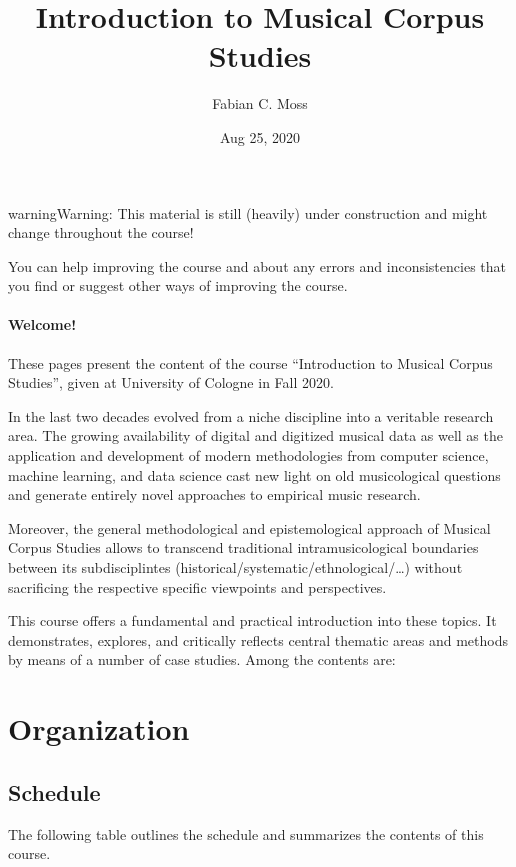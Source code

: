\documentclass[letterpaper,10pt,english]{sphinxmanual}
\title{Introduction to Musical Corpus Studies}
\date{Aug 25, 2020}
\author{Fabian C.\@{} Moss}
\begin{document}
\pagestyle{empty}
\sphinxmaketitle
\pagestyle{plain}
\sphinxtableofcontents
\pagestyle{normal}
\label{\detokenize{index::doc}}


\begin{sphinxadmonition}{warning}{Warning:}
This material is still (heavily) under construction and might change throughout the course!

You can help improving the course and  about any errors and inconsistencies that you find
or suggest other ways of improving the course.
\end{sphinxadmonition}
\subsubsection*{Welcome!}

These pages present the content of the course “Introduction to Musical Corpus Studies”,
given at University of Cologne in Fall 2020.

In the last two decades  evolved from a niche discipline into a veritable research area.
The growing availability of digital and digitized musical data as well as the application and development of modern
methodologies from computer science, machine learning, and data science cast new light on old musicological questions
and generate entirely novel approaches to empirical music research.

Moreover, the general methodological and epistemological approach of Musical Corpus Studies allows to transcend traditional
intra\sphinxhyphen{}musicological boundaries between its sub\sphinxhyphen{}disciplintes (historical/systematic/ethnological/…) without sacrificing the
respective specific viewpoints and perspectives.

This course offers a fundamental and practical introduction into these topics.
It demonstrates, explores, and critically reflects central thematic areas and methods by means of a number of case studies.
Among the contents are:


\chapter{Organization}
\label{\detokenize{orga:organization}}\label{\detokenize{orga::doc}}

\section{Schedule}
\label{\detokenize{orga:schedule}}
The following table outlines the schedule and summarizes the contents of this course.
\end{document}
